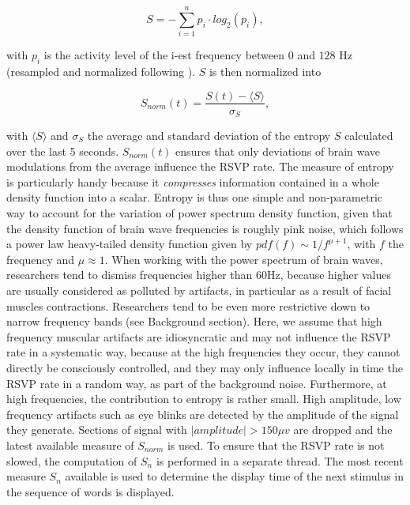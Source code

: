 \begin{equation}
\label{eq:shannon}
S = - \sum_{i=1}^n p_i\cdot log_{2}(p_i),
\end{equation}

with $p_i$ is the activity level of the i-est frequency between $0$ and $128$ Hz (resampled and normalized following \cite{merrill2015}). $S$ is then normalized into 

\begin{equation}
\label{eq:Snormalized}
S_{norm}(t) = \frac{S(t) - \langle S \rangle}{\sigma_{S}}, 
\end{equation}

with $\langle S \rangle$ and $\sigma_{S}$ the average and standard deviation of the entropy $S$ calculated over the last 5 seconds. $S_{norm}(t)$ ensures that only deviations of brain wave modulations from the average influence the RSVP rate. The measure of entropy is particularly handy because it {\it compresses} information contained in a whole density function into a scalar. Entropy is thus one simple and non-parametric way to account for the variation of power spectrum density function, given that the density function of brain wave frequencies is roughly pink noise, which follows a power law heavy-tailed density function given by $pdf(f) \sim 1/f^{\mu+1}$, with $f$ the frequency and $\mu \approx 1$. When working with the power spectrum of brain waves, researchers tend to dismiss frequencies higher than 60Hz, because higher values are usually considered as polluted by artifacts, in particular as a result of facial muscles contractions. Researchers tend to be even more restrictive down to narrow frequency bands (see Background section). Here, we assume that high frequency muscular artifacts are idiosyncratic and may not influence the RSVP rate in a systematic way, because at the high frequencies they occur, they cannot directly be consciously controlled, and they may only influence locally in time the RSVP rate in a random way, as part of the background noise. Furthermore, at high frequencies, the contribution to entropy is rather small. High amplitude, low frequency artifacts such as eye blinks are detected by the amplitude of the signal they generate. Sections of signal with $|amplitude| > 150\mu v$ are dropped and the latest available measure of $S_{norm}$ is used. To ensure that the RSVP rate is not slowed, the computation of $S_n$ is performed in a separate thread. The most recent measure $S_n$ available is used to determine the display time of the next stimulus in the sequence of words is displayed. 


